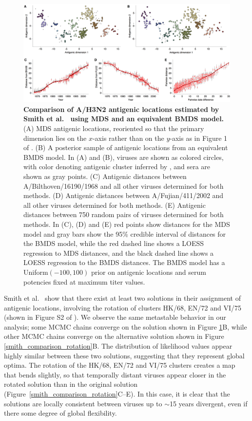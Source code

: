 \documentclass[11pt,oneside,letterpaper]{article}
\begin{document}
\begin{figure}[h]
	\centering		
	\includegraphics[width=1.0\textwidth]{figures/smith_comparison}
	\caption{\textbf{Comparison of A/H3N2 antigenic locations estimated by Smith et al.\ \cite{Smith04} using MDS and an equivalent BMDS model.} 
	(A) MDS antigenic locations, reoriented so that the primary dimension lies on the $x$-axis rather than on the $y$-axis as in Figure 1 of \cite{Smith04}.
	(B) A posterior sample of antigenic locations from an equivalent BMDS model.
	In (A) and (B), viruses are shown as colored circles, with color denoting antigenic cluster inferred by \cite{Smith04}, and sera are shown as gray points.
	(C) Antigenic distances between A/Bilthoven/16190/1968 and all other viruses determined for both methods.
	(D) Antigenic distances between A/Fujian/411/2002 and all other viruses determined for both methods.
	(E) Antigenic distances between 750 random pairs of viruses determined for both methods.	
	In (C), (D) and (E) red points show distances for the MDS model and gray bars show the 95\% credible interval of distances for the BMDS model, while the red dashed line shows a LOESS regression to MDS distances, and the black dashed line shows a LOESS regression to the BMDS distances.
	The BMDS model has a Uniform$(-100,100)$ prior on antigenic locations and serum potencies fixed at maximum titer values. 
	} 
	\label{smith_comparison} 
\end{figure}

Smith et al.\ \cite{Smith04} show that there exist at least two solutions in their assignment of antigenic locations, involving the rotation of clusters HK/68, EN/72 and VI/75 (shown in Figure S2 of \cite{Smith04}).
We observe the same metastable behavior in our analysis; some MCMC chains converge on the solution shown in Figure \ref{smith_comparison}B, while other MCMC chains converge on the alternative solution shown in Figure \ref{smith_comparison_rotation}B.
The distribution of likelihood values appear highly similar between these two solutions, suggesting that they represent global optima.
The rotation of the HK/68, EN/72 and VI/75 clusters creates a map that bends slightly, so that temporally distant viruses appear closer in the rotated solution than in the original solution (Figure~\ref{smith_comparison_rotation}C--E).
In this case, it is clear that the solutions are locally consistent between viruses up to $\sim$15 years divergent, even if there some degree of global flexibility.
\end{document}
